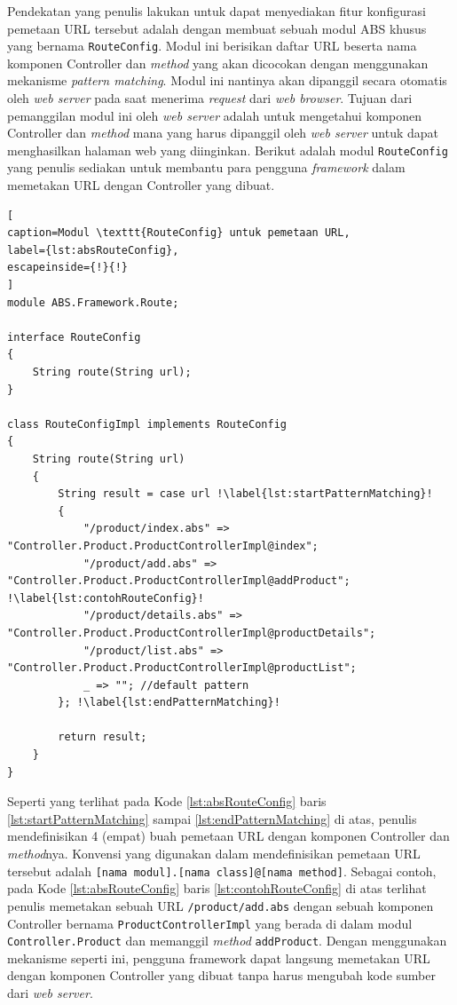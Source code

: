 Pendekatan yang penulis lakukan untuk dapat menyediakan fitur konfigurasi pemetaan URL tersebut adalah dengan membuat sebuah modul ABS khusus yang bernama \texttt{RouteConfig}. Modul ini berisikan daftar URL beserta nama komponen Controller dan \textit{method} yang akan dicocokan dengan menggunakan mekanisme \textit{pattern matching}. Modul ini nantinya akan dipanggil secara otomatis oleh \textit{web server} pada saat menerima \textit{request} dari \textit{web browser}. Tujuan dari pemanggilan modul ini oleh \textit{web server} adalah untuk mengetahui komponen Controller dan \textit{method} mana yang harus dipanggil oleh \textit{web server} untuk dapat menghasilkan halaman web yang diinginkan. Berikut adalah modul \texttt{RouteConfig} yang penulis sediakan untuk membantu para pengguna \textit{framework} dalam memetakan URL dengan Controller yang dibuat.

\begin{lstlisting}[
caption=Modul \texttt{RouteConfig} untuk pemetaan URL,
label={lst:absRouteConfig},
escapeinside={!}{!}
]
module ABS.Framework.Route;

interface RouteConfig
{
	String route(String url);
}

class RouteConfigImpl implements RouteConfig
{
	String route(String url)
	{
		String result = case url !\label{lst:startPatternMatching}!
		{
			"/product/index.abs" => "Controller.Product.ProductControllerImpl@index";
			"/product/add.abs" => "Controller.Product.ProductControllerImpl@addProduct"; !\label{lst:contohRouteConfig}!
			"/product/details.abs" => "Controller.Product.ProductControllerImpl@productDetails";
			"/product/list.abs" => "Controller.Product.ProductControllerImpl@productList";
			_ => ""; //default pattern
		}; !\label{lst:endPatternMatching}!
		
		return result;
	}
}
\end{lstlisting}

Seperti yang terlihat pada Kode \ref{lst:absRouteConfig} baris \ref{lst:startPatternMatching} sampai \ref{lst:endPatternMatching} di atas, penulis mendefinisikan 4 (empat) buah pemetaan URL dengan komponen Controller dan \textit{method}nya. Konvensi yang digunakan dalam mendefinisikan pemetaan URL tersebut adalah \texttt{[nama modul].[nama class]@[nama method]}. Sebagai contoh, pada Kode \ref{lst:absRouteConfig} baris \ref{lst:contohRouteConfig} di atas terlihat penulis memetakan sebuah URL \texttt{/product/add.abs} dengan sebuah komponen Controller bernama \texttt{ProductControllerImpl} yang berada di dalam modul \texttt{Controller.Product} dan memanggil \textit{method} \texttt{addProduct}. Dengan menggunakan mekanisme seperti ini, pengguna framework dapat langsung memetakan URL dengan komponen Controller yang dibuat tanpa harus mengubah kode sumber dari \textit{web server}.\\

